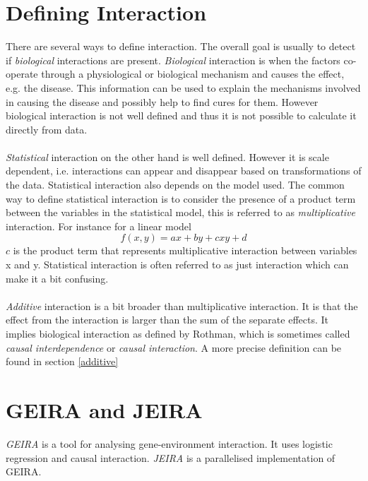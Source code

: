 \documentclass[10pt,a4paper]{report}
\begin{document}
\section{Defining Interaction}
There are several ways to define interaction. The overall goal is usually to detect if \emph{biological} interactions are present. \emph{Biological} interaction is when the factors co-operate through a physiological or biological mechanism and causes the effect, e.g. the disease. This information can be used to explain the mechanisms involved in causing the disease and possibly help to find cures for them. However biological interaction is not well defined and thus it is not possible to calculate it directly from data.\cite{rothman1998modern,rothman2002intro_epidemiology}\\
\\
\emph{Statistical} interaction on the other hand is well defined. However it is scale dependent, i.e. interactions can appear and disappear based on transformations of the data. Statistical interaction also depends on the model used. The common way to define statistical interaction is to consider the presence of a product term between the variables in the statistical model, this is referred to as \emph{multiplicative} interaction. For instance for a linear model
\begin{equation}
f(x,y)=ax+by+cxy+d
\end{equation}
$c$ is the product term that represents multiplicative interaction between variables x and y. Statistical interaction is often referred to as just interaction which can make it a bit confusing.\cite{geira,rothman1998modern}\\
\\
\emph{Additive} interaction is a bit broader than multiplicative interaction. It is that the effect from the interaction is larger than the sum of the separate effects. It implies biological interaction as defined by Rothman, which is sometimes called \emph{causal interdependence} or \emph{causal interaction}. A more precise definition can be found in section \ref{additive}

\section{GEIRA and JEIRA}
\label{jeira}
\emph{GEIRA} is a tool for analysing gene-environment interaction. It uses logistic regression and causal interaction\cite{geira}. \emph{JEIRA} is a parallelised implementation of GEIRA\cite{uvehag_master_thesis}.
\end{document}
